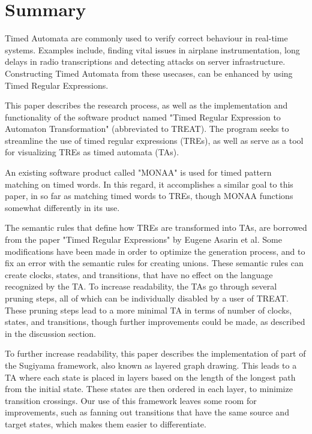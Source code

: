 \section*{Summary}
\thispagestyle{empty}

Timed Automata are commonly used to verify correct behaviour in real-time systems. Examples include, finding vital issues in airplane instrumentation, long delays in radio transcriptions and detecting attacks on server infrastructure. Constructing Timed Automata from these usecases, can be enhanced by using Timed Regular Expressions.

This paper describes the research process, as well as the implementation and functionality of the software product named "Timed Regular Expression to Automaton Transformation" (abbreviated to TREAT).
The program seeks to streamline the use of timed regular expressions (TREs), as well as serve as a tool for visualizing TREs as timed automata (TAs).

An existing software product called "MONAA" is used for timed pattern matching on timed words. In this regard, it accomplishes a similar goal to this paper, in so far as matching timed words to TREs, though MONAA functions somewhat differently in its use.

The semantic rules that define how TREs are transformed into TAs, are borrowed from the paper "Timed Regular Expressions" by Eugene Asarin et al. Some modifications have been made in order to optimize the generation process, and to fix an error with the semantic rules for creating unions. These semantic rules can create clocks, states, and transitions, that have no effect on the language recognized by the TA. To increase readability, the TAs go through several pruning steps, all of which can be individually disabled by a user of TREAT.
These pruning steps lead to a more minimal TA in terms of number of clocks, states, and transitions, though further improvements could be made, as described in the discussion section.

To further increase readability, this paper describes the implementation of part of the Sugiyama framework, also known as layered graph drawing. This leads to a TA where each state is placed in layers based on the length of the longest path from the initial state. These states are then ordered in each layer, to minimize transition crossings. Our use of this framework leaves some room for improvements, such as fanning out transitions that have the same source and target states, which makes them easier to differentiate.

